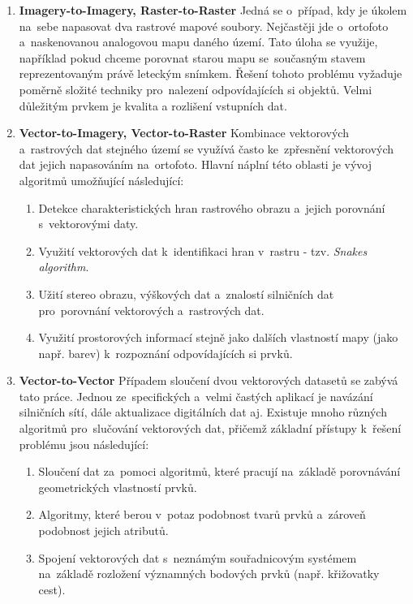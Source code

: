 \begin{enumerate}[leftmargin=*]
  \item \textbf{Imagery-to-Imagery, Raster-to-Raster}
    \subitem Jedná se o~případ, kdy je úkolem na~sebe napasovat dva rastrové mapové soubory. Nejčastěji jde o~ortofoto a~naskenovanou analogovou mapu daného území. Tato úloha
	      se využije, například pokud chceme porovnat starou mapu se~současným stavem reprezentovaným právě leteckým snímkem. Řešení tohoto problému vyžaduje poměrně 
	      složité techniky pro~nalezení odpovídajících si objektů. Velmi důležitým prvkem je kvalita a rozlišení vstupních dat.
  \item \textbf{Vector-to-Imagery, Vector-to-Raster}
    \subitem Kombinace vektorových a~rastrových dat stejného území se využívá často ke~zpřesnění vektorových dat jejich napasováním na~ortofoto. Hlavní náplní této oblasti
	      je vývoj algoritmů umožňující následující: %
	      \begin{enumerate}[leftmargin=*]
	       \item Detekce charakteristických hran rastrového obrazu a~jejich porovnání s~vektorovými daty.
	       \item Využití vektorových dat k~identifikaci hran v~rastru - tzv. \textit{Snakes algorithm}.
	       \item Užití stereo obrazu, výškových dat a~znalostí silničních dat pro~porovnání vektorových a~rastrových dat. %
	       \item Využití prostorových informací stejně jako dalších vlastností mapy (jako např. barev) k~rozpoznání odpovídajících si prvků.
	      \end{enumerate}
  \item \textbf{Vector-to-Vector}
    \subitem Případem sloučení dvou vektorových datasetů se zabývá tato práce. Jednou ze~specifických a~velmi častých aplikací je navázání silničních sítí, dále aktualizace
	      digitálních dat aj. Existuje mnoho různých algoritmů pro~slučování vektorových dat, přičemž základní přístupy k~řešení problému jsou následující: %
	      \begin{enumerate}[leftmargin=*]
	       \item Sloučení dat za~pomoci algoritmů, které pracují na~základě porovnávání geometrických vlastností prvků.
	       \item Algoritmy, které berou v~potaz podobnost tvarů prvků a~zároveň podobnost jejich atributů.
	       \item Spojení vektorových dat s~neznámým souřadnicovým systémem na~základě rozložení významných bodových prvků (např. křižovatky cest).
	      \end{enumerate}

\end{enumerate}


